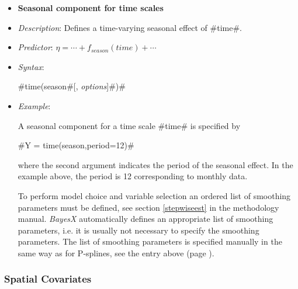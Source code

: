 \begin{itemize}
%
%
%
%
%
%


\item[]{\bf\sffamily Seasonal component for time scales}

\item[] {\em Description}: Defines a time-varying seasonal effect
of #time#. \item[] {\em Predictor}: $\eta =  \cdots +
f_{season}(time) + \cdots $ \item[] {\em Syntax}:

#time(season#[, {\em options}]#)#
\item[] {\em Example}:

A seasonal component for a time scale #time# is specified by

#Y = time(season,period=12)#

where the second argument indicates the period of the seasonal
effect. In the example above, the period is 12 corresponding to
monthly data.

To perform model choice and variable selection an ordered list of smoothing parameters must be defined, see section \autoref{stepwiseest}
in the methodology manual. {\em BayesX} automatically defines an appropriate list of smoothing parameters, i.e. it
is usually not necessary to  specify the smoothing parameters.
The list of smoothing parameters is specified manually in the same way as for P-splines,
see the entry above (page \pageref{psplines_stepwise}).
\end{itemize}

\subsubsection*{Spatial Covariates}

